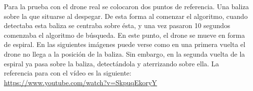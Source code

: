 \hspace{1cm} Para la prueba con el drone real se colocaron dos puntos de referencia. Una baliza sobre la que situarse al despegar. De esta forma al comenzar el algoritmo, cuando detectaba esta baliza se centraba sobre \'esta, y una vez pasaron 10 segundos comenzaba el algoritmo de b\'usqueda. En este punto, el drone se mueve en forma de espiral. En las siguientes im\'agenes puede verse como en una primera vuelta el drone no llega a la posici\'on de la baliza. Sin embargo, en la segunda vuelta de la espiral ya pasa sobre la baliza, detect\'andola y aterrizando sobre ella. La referencia para con el v\'ideo es la siguiente:\\
\underline{\url{https://www.youtube.com/watch?v=SkpuqEkoryY}}



\begin{figure}[H]
 \centering
  \\
  \subfloat[B\'usqueda]{
   \label{f:Busqueda}
}
\end{figure}
